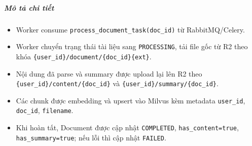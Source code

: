 \subparagraph{Mô tả chi tiết}
\begin{itemize}
\item Worker consume \texttt{process\_document\_task(doc\_id)} từ RabbitMQ/Celery.
\item Worker chuyển trạng thái tài liệu sang \texttt{PROCESSING}, tải file gốc từ R2 theo khóa \texttt{\{user\_id\}/document/\{doc\_id\}\{ext\}}.
\item Nội dung đã parse và summary được upload lại lên R2 theo \texttt{\{user\_id\}/content/\{doc\_id\}} và \texttt{\{user\_id\}/summary/\{doc\_id\}}.
\item Các chunk được embedding và upsert vào Milvus kèm metadata \texttt{user\_id}, \texttt{doc\_id}, \texttt{filename}.
\item Khi hoàn tất, Document được cập nhật \texttt{COMPLETED}, \texttt{has\_content=true}, \texttt{has\_summary=true}; nếu lỗi thì cập nhật \texttt{FAILED}.
\end{itemize}
